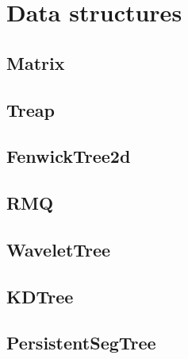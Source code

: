 \chapter{Data structures}

\section{Matrix}
\section{Treap}
\section{FenwickTree2d}
\section{RMQ}
\section{WaveletTree}
\section{KDTree}
\section{PersistentSegTree}
